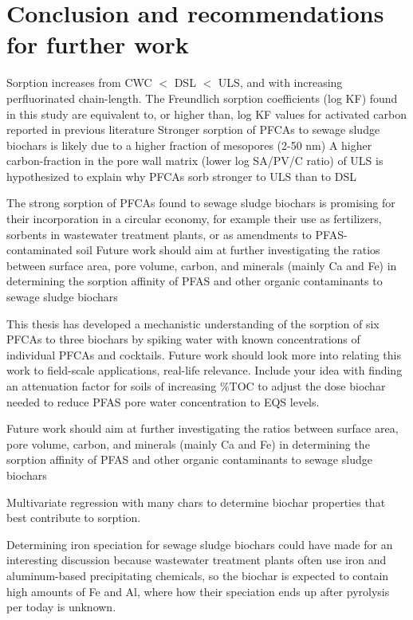 \chapter{Conclusion and recommendations for further work}\label{chap:Conclusion}

Sorption increases from CWC $<$ DSL $<$ ULS, and with increasing perfluorinated chain-length. The Freundlich sorption coefficients (log KF) found in this study are equivalent to, or higher than, log KF  values for activated carbon reported in previous literature
Stronger sorption of PFCAs to sewage sludge biochars is likely due to a higher fraction of mesopores (2-50 nm)
A higher carbon-fraction in the pore wall matrix (lower log SA/PV/C ratio) of ULS is hypothesized to explain why PFCAs sorb stronger to ULS than to DSL 

The strong sorption of PFCAs found to sewage sludge biochars is promising for their incorporation in a circular economy, for example their use as fertilizers, sorbents in wastewater treatment plants, or as amendments to PFAS-contaminated soil
Future work should aim at further investigating the ratios between surface area, pore volume, carbon, and minerals (mainly Ca and Fe) in determining the sorption affinity of PFAS and other organic contaminants to sewage sludge biochars

This thesis has developed a mechanistic understanding of the sorption of six PFCAs to three biochars by spiking water with known concentrations of individual PFCAs and cocktails. Future work should look more into relating this work to field-scale applications, real-life relevance. Include your idea with finding an attenuation factor for soils of increasing \%TOC to adjust the dose biochar needed to reduce PFAS pore water concentration to EQS levels. 

Future work should aim at further investigating the ratios between surface area, pore volume, carbon, and minerals (mainly Ca and Fe) in determining the sorption affinity of PFAS and other organic contaminants to sewage sludge biochars

Multivariate regression with many chars to determine biochar properties that best contribute to sorption.

Determining iron speciation for sewage sludge biochars could have made for an interesting discussion because wastewater treatment plants often use iron and aluminum-based precipitating chemicals, so the biochar is expected to contain high amounts of Fe and Al, where how their speciation ends up after pyrolysis per today is unknown. 






